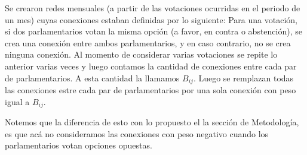 \documentclass{proyectotesis}
\begin{document}
Se crearon redes mensuales (a partir de las votaciones ocurridas en el periodo de un mes) cuyas conexiones estaban definidas por lo siguiente: Para una votación, si dos parlamentarios votan la misma opción (a favor, en contra o  abstención), se crea una conexión entre ambos parlamentarios, y en caso contrario, no se crea ninguna conexión. Al momento de considerar varias votaciones se repite lo anterior varias veces y luego contamos la cantidad de conexiones entre cada par de parlamentarios. A esta cantidad la llamamos $B_{ij}$. Luego se remplazan todas las conexiones estre cada par de parlamentarios por una sola conexión con peso igual a $B_{ij}$.

Notemos que la diferencia de esto con lo propuesto el la sección de Metodología, es que acá no consideramos las conexiones con peso negativo cuando los parlamentarios votan opciones opuestas. \\
\end{document}
